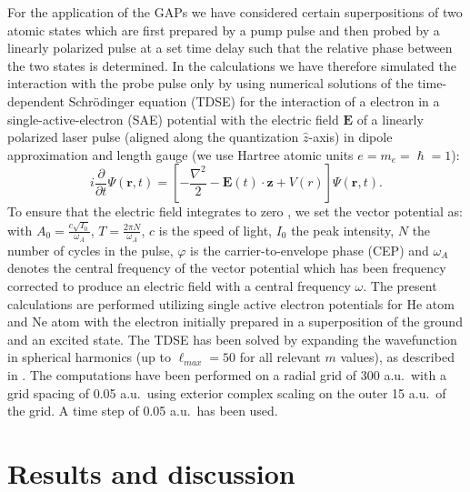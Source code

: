 For the application of the GAPs we have considered certain superpositions of two atomic states which are first prepared by a pump pulse and then probed by a linearly polarized pulse at a set time delay such that the relative phase between the two states is determined. In the calculations we have therefore simulated the interaction with the probe pulse only by
using numerical solutions of the time-dependent Schr\"odinger equation (TDSE) for the interaction of a electron in a single-active-electron (SAE) potential with the electric field $\mathbf{E}$ of a linearly polarized laser pulse (aligned along the quantization ${\hat z}$-axis) in dipole approximation and length gauge (we use Hartree atomic units $e = m_e = \hslash =1$): 
\begin{equation}
i\frac{\partial}{\partial t}\Psi(\mathbf{r},t) = \left[-\frac{\nabla^2}{2} - \mathbf{E}(t) \cdot \mathbf{z} + V(r)\right]\Psi(\mathbf{r},t).
\end{equation}
To ensure that the electric field integrates to zero \cite{chelkowski_sensitivity_2002}, we set the vector potential as:
with $A_0 = \frac{c\sqrt{I_0}}{\omega_A}$, $T = \frac{2\pi N}{\omega_A}$, $c$ is the speed of light, $I_0$ the peak intensity, $N$ the number of cycles in the pulse, $\varphi$ is the carrier-to-envelope phase (CEP) and $\omega_A$ denotes the central frequency of the vector potential which has been frequency corrected \cite{venzke_central_2018} to produce an electric field with a central frequency $\omega$.  The present calculations are performed utilizing single active electron potentials for He atom and Ne atom \cite{reiff_single-active_2020} with the electron initially prepared in a superposition of the ground and an excited state. The TDSE has been solved by expanding the wavefunction in spherical harmonics (up to $\ell_{max} = 50$ for all relevant $m$ values), as described in \cite{venzke_ionization_2020}. The computations have been performed on a radial grid of 300 a.u.\ with a grid spacing of 0.05 a.u.\, using exterior complex scaling on the outer 15 a.u.\ of the grid. A time step of 0.05 a.u.\ has been used.

\section*{Results and discussion}

